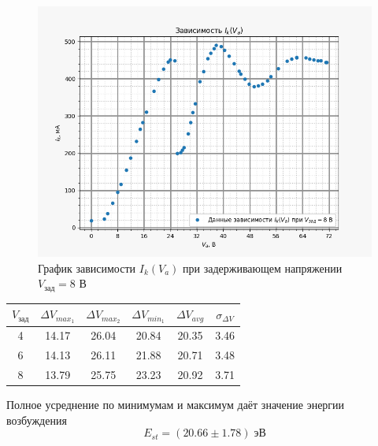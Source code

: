     \begin{figure}[H]
        \centering
        \includegraphics[width = 12 cm]{images/V_th_8_static}
        \caption{График зависимости $I_k(V_a)$ при задерживающем напряжении $V_{\text{зад}} = 8$ В}
        \label{fig:vth8_static}
    \end{figure}

    \begin{table}[H]
        \centering
        \begin{tabular}{|c|c|c|c|c|c|}
            \hline
            $V_{\text{зад}}$ & $\Delta V_{max_1}$ & $\Delta V_{max_2}$ & $\Delta V_{min_1}$ & $\Delta V_{avg}$ & $\sigma_{\Delta V}$\\ \hline
            4                & 14.17              & 26.04              & 20.84              & 20.35            & 3.46                                                           \\ \hline
            6                & 14.13              & 26.11              & 21.88              & 20.71            & 3.48                                                           \\ \hline
            8                & 13.79              & 25.75              & 23.23              & 20.92            & 3.71                                                           \\ \hline
        \end{tabular}
    \end{table}

    Полное усреднение по минимумам и максимум даёт значение энергии возбуждения
    \begin{equation}
        E_{st} = (20.66 \pm 1.78) \; \text{эВ}
    \end{equation}


